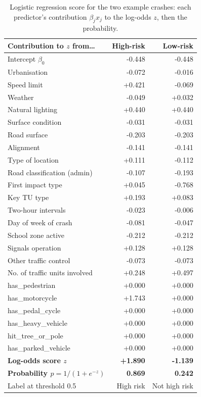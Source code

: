 \documentclass[11pt,a4paper]{article}
\begin{document}
\begin{table}[H]
\centering
\caption{Logistic regression score for the two example crashes: each predictor's contribution
$\beta_j x_j$ to the log-odds $z$, then the probability.}
\label{tab:example_lr}
\footnotesize
\begin{tabular}{@{}lrr@{}}
\toprule
\textbf{Contribution to $z$ from\ldots} & \textbf{High-risk} & \textbf{Low-risk} \\
\midrule
Intercept $\beta_0$ & -0.448 & -0.448 \\
Urbanisation & -0.072 & -0.016 \\
Speed limit & +0.421 & -0.069 \\
Weather & -0.049 & +0.032 \\
Natural lighting & +0.440 & +0.440 \\
Surface condition & -0.031 & -0.031 \\
Road surface & -0.203 & -0.203 \\
Alignment & -0.141 & -0.141 \\
Type of location & +0.111 & -0.112 \\
Road classification (admin) & -0.107 & -0.193 \\
First impact type & +0.045 & -0.768 \\
Key TU type & +0.193 & +0.083 \\
Two-hour intervals & -0.023 & -0.006 \\
Day of week of crash & -0.081 & -0.047 \\
School zone active & -0.212 & -0.212 \\
Signals operation & +0.128 & +0.128 \\
Other traffic control & -0.073 & -0.073 \\
No. of traffic units involved & +0.248 & +0.497 \\
has\_pedestrian & +0.000 & +0.000 \\
has\_motorcycle & +1.743 & +0.000 \\
has\_pedal\_cycle & +0.000 & +0.000 \\
has\_heavy\_vehicle & +0.000 & +0.000 \\
hit\_tree\_or\_pole & +0.000 & +0.000 \\
has\_parked\_vehicle & +0.000 & +0.000 \\
\midrule
\textbf{Log-odds score $z$} & \textbf{+1.890} & \textbf{-1.139} \\
\textbf{Probability $\hat{p} = 1/(1+e^{-z})$} & \textbf{0.869} & \textbf{0.242} \\
Label at threshold 0.5 & High risk & Not high risk \\
\bottomrule
\end{tabular}
\end{table}
\end{document}
